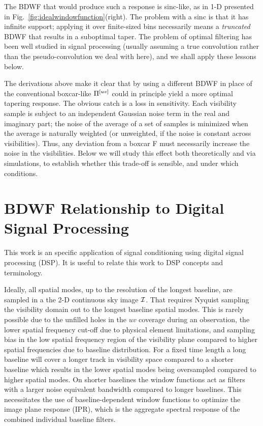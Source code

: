\documentclass[useAMS,usenatbib]{mn2e}
\begin{document}
The BDWF that would produce such a response is sinc-like, as in 1-D presented in Fig.~\ref{fig:idealwindowfunction}(right). 
The problem with a sinc is that it has infinite support; applying it over finite-sized bins necessarily means a \emph{truncated} 
BDWF that results in a suboptimal taper. The problem of optimal filtering has been well studied in signal processing (usually
assuming a true convolution rather than the pseudo-convolution we deal with here), and we shall apply these lessons below.

The derivations above make it clear that by using a different BDWF in place of the conventional boxcar-like $\Pi^{[uv]}$ 
could in principle yield a more optimal tapering response. The obvious catch is a loss in 
sensitivity. Each visibility sample is subject to an independent Gaussian noise term in the real and imaginary part; the noise of
the average of a set of samples is minimized when the average is naturally weighted (or unweighted, if the noise is 
constant across visibilities). Thus, any deviation from a boxcar F must necessarily increase the noise in the 
visibilities. Below we will study this effect both theoretically and via simulations, to establish whether this 
trade-off is sensible, and under which conditions.

\section{BDWF Relationship to Digital Signal Processing}
\label{sec:bdwf_dsp}

This work is an specific application of signal conditioning using digital signal
processing (DSP). It is useful to relate this work to DSP concepts and
terminology.

Ideally, all spatial modes, up to the resolution of the longest baseline, are
sampled in a the 2-D continuous sky image $\mathcal{I}$. That requires Nyquist sampling
the visibility domain out to the longest baseline spatial modes.
This is rarely possible due to the unfilled holes in the
$uv$ coverage during an observation, the lower spatial frequency cut-off due to
physical element limitations, and sampling bias in the low spatial frequency
region of the visibility plane compared to higher spatial frequencies due to
baseline distribution. For a fixed time length a long baseline will cover a
longer track in visibility space compared to a shorter baseline which results in
the lower spatial modes being oversampled compared to higher spatial modes. On
shorter baselines the window functions act as filters with a larger noise
equivalent bandwidth compared to longer baselines. This
necessitates the use of baseline-dependent window functions to optimize the
image plane response (IPR), which is the aggregate spectral response of the
combined individual baseline filters.
\end{document}
